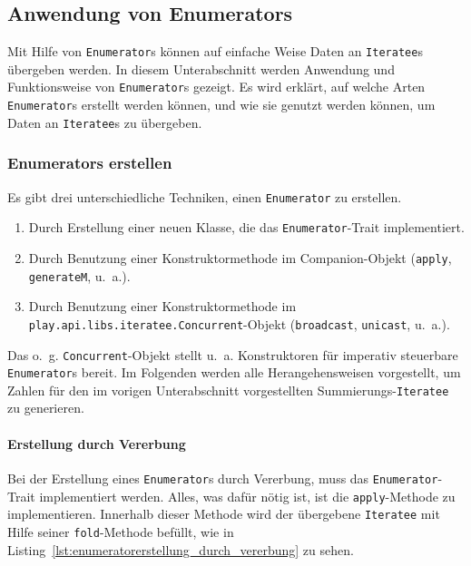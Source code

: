 

\subsection{Anwendung von Enumerators} %
\label{sub:enumerators}

Mit Hilfe von \lstinline|Enumerator|s können auf einfache Weise Daten an \lstinline|Iteratee|s übergeben werden.
In diesem Unterabschnitt werden Anwendung und Funktionsweise von \lstinline|Enumerator|s gezeigt.
Es wird erklärt, auf welche Arten \lstinline|Enumerator|s erstellt werden können, und wie sie genutzt werden können, um Daten an \lstinline|Iteratee|s zu übergeben.

\subsubsection{Enumerators erstellen} %
\label{ssub:enumerators_erstellen}

Es gibt drei unterschiedliche Techniken, einen \lstinline|Enumerator| zu erstellen.
\begin{enumerate}
  \item Durch Erstellung einer neuen Klasse, die das \lstinline|Enumerator|-Trait implementiert.
  \item Durch Benutzung einer Konstruktormethode im Companion-Objekt (\lstinline|apply|, \lstinline|generateM|, u.~a.).
  \item Durch Benutzung einer Konstruktormethode im \lstinline|play.api.libs.iteratee.Concurrent|-Objekt (\lstinline|broadcast|, \lstinline|unicast|, u.~a.).
\end{enumerate}

Das o.~g. \lstinline|Concurrent|-Objekt stellt u.~a. Konstruktoren für imperativ steuerbare \lstinline|Enumerator|s bereit.
Im Folgenden werden alle Herangehensweisen vorgestellt, um Zahlen für den im vorigen Unterabschnitt vorgestellten Summierungs-\lstinline|Iteratee| zu generieren.

\paragraph{Erstellung durch Vererbung} %
\label{par:enumeratorerstellung_durch_vererbung}\mbox{} %

Bei der Erstellung eines \lstinline|Enumerator|s durch Vererbung, muss das \lstinline|Enumerator|-Trait implementiert werden.
Alles, was dafür nötig ist, ist die \lstinline|apply|-Methode zu implementieren.
Innerhalb dieser Methode wird der übergebene \lstinline|Iteratee| mit Hilfe seiner \lstinline|fold|-Methode befüllt, wie in Listing~\ref{lst:enumeratorerstellung_durch_vererbung} zu sehen.


